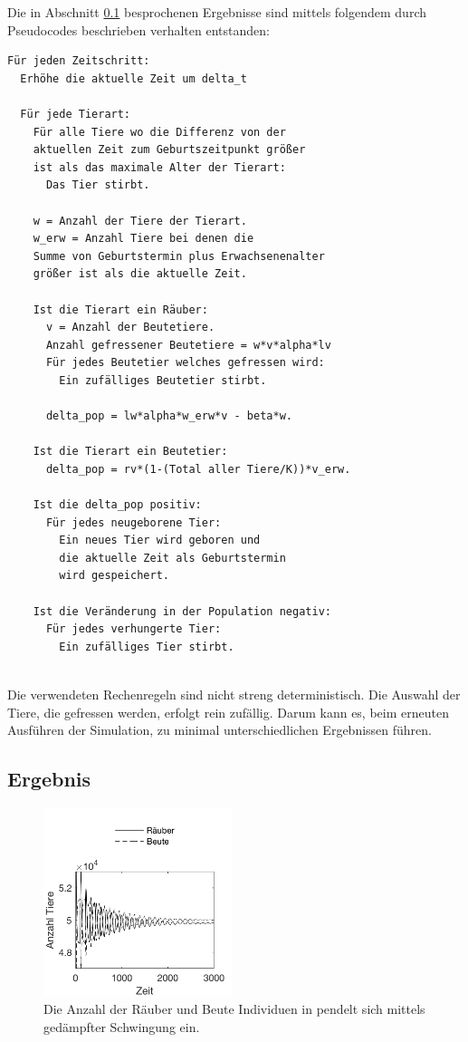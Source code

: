 \documentclass[a4paper,twoside]{article}
\begin{document}
	Die in Abschnitt \ref{sec:Ergebnis_Agent_Model} besprochenen Ergebnisse sind mittels folgendem durch Pseudocodes beschrieben verhalten entstanden:
	
	\begin{small}
	\begin{verbatim}
Für jeden Zeitschritt:
  Erhöhe die aktuelle Zeit um delta_t

  Für jede Tierart:
    Für alle Tiere wo die Differenz von der 
    aktuellen Zeit zum Geburtszeitpunkt größer
    ist als das maximale Alter der Tierart:
      Das Tier stirbt.

    w = Anzahl der Tiere der Tierart.
    w_erw = Anzahl Tiere bei denen die 
    Summe von Geburtstermin plus Erwachsenenalter 
    größer ist als die aktuelle Zeit.

    Ist die Tierart ein Räuber:
      v = Anzahl der Beutetiere.
      Anzahl gefressener Beutetiere = w*v*alpha*lv
      Für jedes Beutetier welches gefressen wird:
        Ein zufälliges Beutetier stirbt.
            
      delta_pop = lw*alpha*w_erw*v - beta*w.

    Ist die Tierart ein Beutetier:
      delta_pop = rv*(1-(Total aller Tiere/K))*v_erw.

    Ist die delta_pop positiv:
      Für jedes neugeborene Tier:
        Ein neues Tier wird geboren und 
        die aktuelle Zeit als Geburtstermin 
        wird gespeichert.

    Ist die Veränderung in der Population negativ:
      Für jedes verhungerte Tier:
        Ein zufälliges Tier stirbt.	
 		
	\end{verbatim}
	\end{small}
	
	Die verwendeten Rechenregeln sind nicht streng deterministisch. Die Auswahl der Tiere, die gefressen werden, erfolgt rein zufällig. Darum kann es, beim erneuten Ausführen der Simulation, zu minimal unterschiedlichen Ergebnissen führen.
	
	\subsection{Ergebnis}\label{sec:Ergebnis_Agent_Model}
	
	\begin{figure}[!h]
  		\centering
 		\includegraphics[width=5.5cm]{Diagramme/agent_model_damped.png}
  		\caption{Die Anzahl der Räuber und Beute Individuen in pendelt sich mittels gedämpfter Schwingung ein.}
  		\label{fig:agent_model_damped}
	\end{figure}
	
\end{document}
